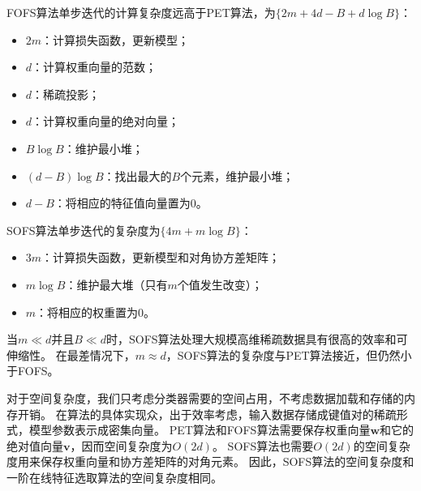 \documentclass[doctor]{ustcthesis}
\def \v {\mathbf{v}}
\def \w  {\mathbf{w}}
\begin{document}
FOFS算法单步迭代的计算复杂度远高于PET算法，为$\{2m + 4d - B + d\log B\}$：
\vspace{-0.8em}
\begin{itemize}\setlength{\itemsep}{-0.5em}
    \item $2m$：计算损失函数，更新模型；
    \item $d$：计算权重向量的范数；
    \item $d$：稀疏投影；
    \item $d$：计算权重向量的绝对向量；
    \item $B\log B$：维护最小堆；
    \item $(d-B)\log B$：找出最大的$B$个元素，维护最小堆；
    \item $d-B$：将相应的特征值向量置为$0$。
\end{itemize}

SOFS算法单步迭代的复杂度为$\{4m + m\log B\}$：
\vspace{-0.8em}
\begin{itemize}\setlength{\itemsep}{-0.5em}
    \item $3m$：计算损失函数，更新模型和对角协方差矩阵；
    \item $m\log B$：维护最大堆（只有$m$个值发生改变）；
    \item $m$：将相应的权重置为$0$。
\end{itemize}

当$m\ll d$并且$B\ll d$时，SOFS算法处理大规模高维稀疏数据具有很高的效率和可伸缩性。
在最差情况下，$m\approx d$，SOFS算法的复杂度与PET算法接近，但仍然小于FOFS。

对于空间复杂度，我们只考虑分类器需要的空间占用，不考虑数据加载和存储的内存开销。
在算法的具体实现众，出于效率考虑，输入数据存储成键值对的稀疏形式，模型参数表示成密集向量。
PET算法和FOFS算法需要保存权重向量$\w$和它的绝对值向量$\v$，因而空间复杂度为$O(2d)$。
SOFS算法也需要$O(2d)$的空间复杂度用来保存权重向量和协方差矩阵的对角元素。
因此，SOFS算法的空间复杂度和一阶在线特征选取算法的空间复杂度相同。
\end{document}
